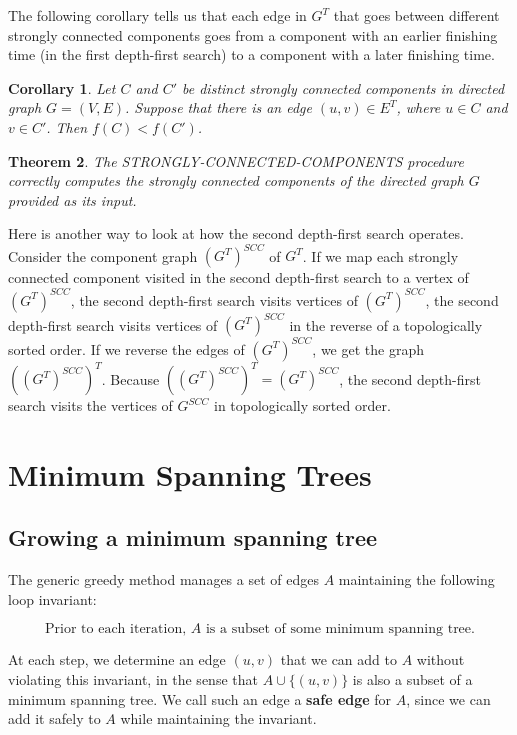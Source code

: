 \documentclass[12pt]{article}
\newtheorem{theorem}{Theorem}
\newtheorem{corollary}[theorem]{Corollary}
\begin{document}
The following corollary tells us that each edge in $G^T$ that goes between different strongly connected components goes from a component with an earlier finishing time (in the first depth-first search) to a component with a later finishing time.

\begin{corollary}
  Let $C$ and $C'$ be distinct strongly connected components in directed graph $G = (V,E)$. Suppose that there is an edge $(u,v) \in E^T$, where $u \in C$ and $v \in C'$. Then $f(C) < f(C')$.
\end{corollary}

\begin{theorem}
  The STRONGLY-CONNECTED-COMPONENTS procedure correctly computes the strongly connected components of the directed graph $G$ provided as its input.
\end{theorem}

Here is another way to look at how the second depth-first search operates. Consider the component graph $(G^T)^{SCC}$ of $G^T$. If we map each strongly connected component visited in the second depth-first search to a vertex of $(G^T)^{SCC}$, the second depth-first search visits vertices of $(G^T)^{SCC}$, the second depth-first search visits vertices of $(G^T)^{SCC}$ in the reverse of a topologically sorted order. If we reverse the edges of $(G^T)^{SCC}$, we get the graph $((G^T)^{SCC})^T$. Because $((G^T)^{SCC})^T = (G^T)^{SCC}$, the second depth-first search visits the vertices of $G^{SCC}$ in topologically sorted order.

\section{Minimum Spanning Trees}

\subsection{Growing a minimum spanning tree}

The generic greedy method manages a set of edges $A$ maintaining the following loop invariant:

\begin{equation*}
  \text{Prior to each iteration, $A$ is a subset of some minimum spanning tree.}
\end{equation*}

At each step, we determine an edge $(u,v)$ that we can add to $A$ without violating this invariant, in the sense that $A \cup \{ (u,v) \}$ is also a subset of a minimum spanning tree.  We call such an edge a \textbf{safe edge} for $A$, since we can add it safely to $A$ while maintaining the invariant. \\
\end{document}

